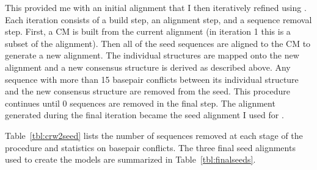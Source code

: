 This provided me with an initial alignment that I then iteratively
refined using . Each iteration consists of a build
step, an alignment step, and a sequence removal step. First, a CM is
built from the current alignment (in iteration 1 this is a subset of
the  alignment). Then all of the seed sequences are aligned to the
CM to generate a new alignment. The individual structures are mapped
onto the new alignment and a new consensus structure is derived as
described above.  Any sequence with more than 15 basepair conflicts
between its individual structure and the new consensus structure are
removed from the seed.  This procedure continues until 0 sequences are
removed in the final step. The alignment generated during the final
iteration became the seed alignment I used for .

Table~\ref{tbl:crw2seed} lists the number of sequences removed at each
stage of the procedure and statistics on basepair conflicts. 
The three final seed alignments used to create the  
models are summarized in Table~\ref{tbl:finalseeds}.


